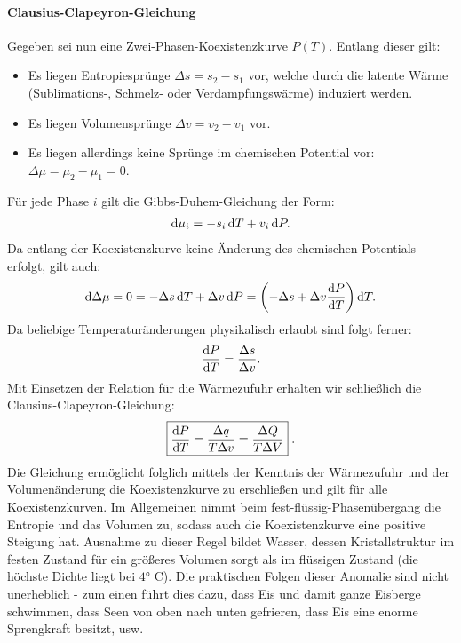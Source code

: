 \paragraph*{Clausius-Clapeyron-Gleichung}
Gegeben sei nun eine Zwei-Phasen-Koexistenzkurve $P(T)$.
Entlang dieser gilt:
\begin{itemize}
    \item Es liegen Entropiesprünge $\Delta s=s_2-s_1$ vor, welche durch die latente Wärme (Sublimations-, Schmelz- oder Verdampfungswärme) induziert werden.
    \item Es liegen Volumensprünge $\Delta v=v_2-v_1$ vor.
    \item Es liegen allerdings keine Sprünge im chemischen Potential vor: $\Delta \mu=\mu_2-\mu_1=0$.
\end{itemize}
Für jede Phase $i$ gilt die Gibbs-Duhem-Gleichung der Form:
\begin{align*}
    \mathop{}\!\mathrm{d} \mu_i=-s_i\mathop{}\!\mathrm{d} T+v_i\mathop{}\!\mathrm{d} P.
\end{align*}
Da entlang der Koexistenzkurve keine Änderung des chemischen Potentials erfolgt, gilt auch:
\begin{align*}
    \mathop{}\!\mathrm{d} \Delta \mu=0=-\Delta s\mathop{}\!\mathrm{d} T+\Delta v\mathop{}\!\mathrm{d} P=\left(-\Delta s+\Delta v\frac{\mathop{}\!\mathrm{d} P}{\mathop{}\!\mathrm{d} T}\right)\mathop{}\!\mathrm{d} T.
\end{align*}
Da beliebige Temperaturänderungen physikalisch erlaubt sind folgt ferner:
\begin{align*}
    \frac{\mathop{}\!\mathrm{d} P}{\mathop{}\!\mathrm{d} T}=\frac{\Delta s}{\Delta v}.
\end{align*}
Mit Einsetzen der Relation für die Wärmezufuhr erhalten wir schließlich die Clausius-Clapeyron-Gleichung:
\begin{align*}
    \boxed{\frac{\mathop{}\!\mathrm{d} P}{\mathop{}\!\mathrm{d} T}=\frac{\Delta q}{T\Delta v}=\frac{\Delta Q}{T\Delta V}}\;.
\end{align*}
Die Gleichung ermöglicht folglich mittels der Kenntnis der Wärmezufuhr und der Volumenänderung die Koexistenzkurve zu erschließen und gilt für alle Koexistenzkurven.
Im Allgemeinen nimmt beim fest-flüssig-Phasenübergang die Entropie und das Volumen zu, sodass auch die Koexistenzkurve eine positive Steigung hat. Ausnahme zu dieser Regel bildet Wasser, dessen Kristallstruktur im festen Zustand für ein größeres Volumen sorgt als im flüssigen Zustand (die höchste Dichte liegt bei $4°$ C). Die praktischen Folgen dieser Anomalie sind nicht unerheblich - zum einen führt dies dazu, dass Eis und damit ganze Eisberge schwimmen, dass Seen von oben nach unten gefrieren, dass Eis eine enorme Sprengkraft besitzt, usw.
